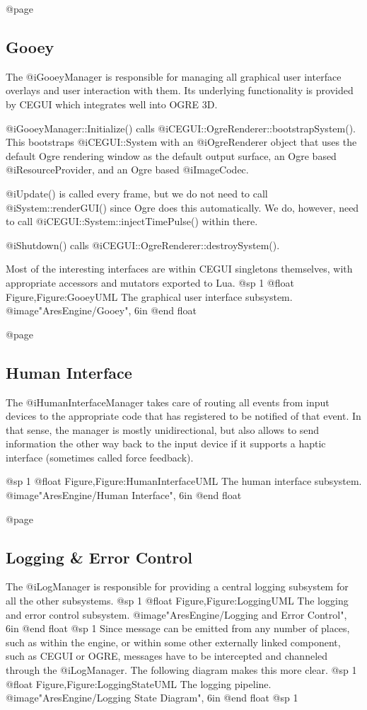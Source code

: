 @page 
\subsection{Gooey}
The @i{GooeyManager} is responsible for managing all graphical user interface overlays and user interaction with them. Its underlying functionality is provided by CEGUI which integrates well into OGRE 3D.

@i{GooeyManager::Initialize()} calls @i{CEGUI::OgreRenderer::bootstrapSystem()}. This bootstraps @i{CEGUI::System} with an @i{OgreRenderer} object that uses the default Ogre rendering window as the default output surface, an Ogre based @i{ResourceProvider}, and an Ogre based @i{ImageCodec}.

@i{Update()} is called every frame, but we do not need to call @i{System::renderGUI()} since Ogre does this automatically. We do, however, need to call @i{CEGUI::System::injectTimePulse()} within there.

@i{Shutdown()} calls @i{CEGUI::OgreRenderer::destroySystem()}.

Most of the interesting interfaces are within CEGUI singletons themselves, with appropriate accessors and mutators exported to Lua.
@sp 1
@float Figure,Figure:GooeyUML
The graphical user interface subsystem.
@image{"AresEngine/Gooey", 6in}
@end float

@page 
\subsection{Human Interface}
The @i{HumanInterfaceManager} takes care of routing all events from input devices to the appropriate code that has registered to be notified of that event. In that sense, the manager is mostly unidirectional, but also allows to send information the other way back to the input device if it supports a haptic interface (sometimes called force feedback).

@sp 1
@float Figure,Figure:HumanInterfaceUML
The human interface subsystem.
@image{"AresEngine/Human Interface", 6in}
@end float

@page 
\subsection{Logging & Error Control}
The @i{LogManager} is responsible for providing a central logging subsystem for all the other subsystems.
@sp 1
@float Figure,Figure:LoggingUML
The logging and error control subsystem.
@image{"AresEngine/Logging and Error Control", 6in}
@end float
@sp 1
Since message can be emitted from any number of places, such as within the engine, or within some other externally linked component, such as CEGUI or OGRE, messages have to be intercepted and channeled through the @i{LogManager}. The following diagram makes this more clear.
@sp 1
@float Figure,Figure:LoggingStateUML
The logging pipeline.
@image{"AresEngine/Logging State Diagram", 6in}
@end float
@sp 1

